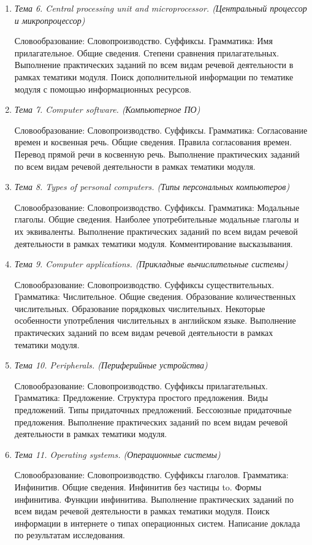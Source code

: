 \begin{enumerate}
\item \textit{Тема 6. Central processing unit and microprocessor. (Центральный процессор и микропроцессор)}\par
Словообразование: Словопроизводство. Суффиксы. Грамматика: Имя прилагательное. Общие сведения. Степени сравнения прилагательных.
Выполнение практических заданий по всем видам речевой деятельности в рамках тематики модуля. Поиск дополнительной информации по тематике модуля с помощью информационных ресурсов.
\item \textit{Тема 7. Computer software. (Компьютерное ПО)} \par	Словообразование: Словопроизводство. Суффиксы.
Грамматика: Согласование времен и косвенная речь. Общие сведения. Правила согласования времен. Перевод прямой речи в косвенную речь.
Выполнение практических заданий по всем видам речевой деятельности в рамках тематики модуля. 
\item \textit{Тема 8. Types of personal computers. (Типы персональных компьютеров)} \par	Словообразование: Словопроизводство. Суффиксы. Грамматика: Модальные глаголы. Общие сведения. Наиболее употребительные модальные глаголы и их эквиваленты.
Выполнение практических заданий по всем видам речевой деятельности в рамках тематики модуля. Комментирование высказывания.
\item \textit{Тема 9. Computer applications. (Прикладные вычислительные системы)} \par 
Словообразование: Словопроизводство. Суффиксы существительных.
Грамматика: Числительное. Общие сведения. Образование количественных числительных. Образование порядковых числительных. Некоторые особенности употребления числительных в английском языке.
Выполнение практических заданий по всем видам речевой деятельности в рамках тематики модуля. 
\item \textit{Тема 10. Peripherals. (Периферийные устройства)} \par	Словообразование: Словопроизводство. Суффиксы прилагательных.
Грамматика: Предложение. Структура простого предложения.  Виды предложений. Типы придаточных предложений. Бессоюзные придаточные предложения. Выполнение практических заданий по всем видам речевой деятельности в рамках тематики модуля. 
\item \textit{Тема 11. Operating systems. (Операционные системы)} \par
Словообразование: Словопроизводство. Суффиксы глаголов. Грамматика: Инфинитив. Общие сведения. Инфинитив без частицы to. Формы инфинитива. Функции инфинитива. Выполнение практических заданий по всем видам речевой деятельности в рамках тематики модуля. Поиск информации в интернете о типах операционных систем.  Написание доклада по результатам исследования.

\end{enumerate}
